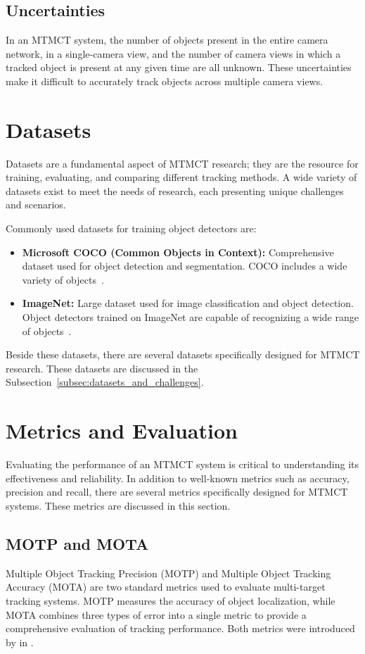 \subsection{Uncertainties}\label{subsec:uncertainties}
In an MTMCT system, the number of objects present in the entire camera network, in a single-camera view, and the number of camera views in which a tracked object is present at any given time are all unknown. These uncertainties make it difficult to accurately track objects across multiple camera views.

\section{Datasets}\label{sec:datasets}
Datasets are a fundamental aspect of MTMCT research; they are the resource for training, evaluating, and comparing different tracking methods. A wide variety of datasets exist to meet the needs of research, each presenting unique challenges and scenarios.

Commonly used datasets for training object detectors are:

\begin{itemize}
    \item \textbf{Microsoft COCO (Common Objects in Context):} Comprehensive dataset used for object detection and segmentation. COCO includes a wide variety of objects~\cite{Lin14}.
    \item \textbf{ImageNet:} Large dataset used for image classification and object detection. Object detectors trained on ImageNet are capable of recognizing a wide range of objects~\cite{Deng09}.
\end{itemize}

Beside these datasets, there are several datasets specifically designed for MTMCT research. These datasets are discussed in the Subsection~\ref{subsec:datasets_and_challenges}.

\section{Metrics and Evaluation}\label{sec:metrics_and_evaluation}
Evaluating the performance of an MTMCT system is critical to understanding its effectiveness and reliability. In addition to well-known metrics such as accuracy, precision and recall, there are several metrics specifically designed for MTMCT systems. These metrics are discussed in this section.

\subsection{MOTP and MOTA}\label{subsec:motp_mota}
Multiple Object Tracking Precision (MOTP) and Multiple Object Tracking Accuracy (MOTA) are two standard metrics used to evaluate multi-target tracking systems. MOTP measures the accuracy of object localization, while MOTA combines three types of error into a single metric to provide a comprehensive evaluation of tracking performance. Both metrics were introduced by \textcite{Bernardin08} in \citeyear{Bernardin08}.

